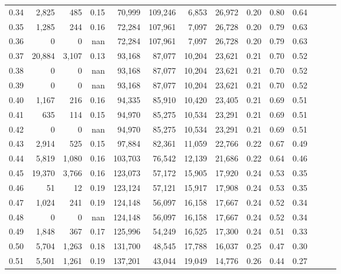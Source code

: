 \begin{tabular}{rrrrrrrrrrrrrr}
0.34 &   2,825 &    485 &  0.15 &   70,999 &  109,246 &   6,853 &  26,972 &  0.20 &  0.80 &      0.64 \\
0.35 &   1,285 &    244 &  0.16 &   72,284 &  107,961 &   7,097 &  26,728 &  0.20 &  0.79 &      0.63 \\
0.36 &       0 &      0 &   nan &   72,284 &  107,961 &   7,097 &  26,728 &  0.20 &  0.79 &      0.63 \\
0.37 &  20,884 &  3,107 &  0.13 &   93,168 &   87,077 &  10,204 &  23,621 &  0.21 &  0.70 &      0.52 \\
0.38 &       0 &      0 &   nan &   93,168 &   87,077 &  10,204 &  23,621 &  0.21 &  0.70 &      0.52 \\
0.39 &       0 &      0 &   nan &   93,168 &   87,077 &  10,204 &  23,621 &  0.21 &  0.70 &      0.52 \\
0.40 &   1,167 &    216 &  0.16 &   94,335 &   85,910 &  10,420 &  23,405 &  0.21 &  0.69 &      0.51 \\
0.41 &     635 &    114 &  0.15 &   94,970 &   85,275 &  10,534 &  23,291 &  0.21 &  0.69 &      0.51 \\
0.42 &       0 &      0 &   nan &   94,970 &   85,275 &  10,534 &  23,291 &  0.21 &  0.69 &      0.51 \\
0.43 &   2,914 &    525 &  0.15 &   97,884 &   82,361 &  11,059 &  22,766 &  0.22 &  0.67 &      0.49 \\
0.44 &   5,819 &  1,080 &  0.16 &  103,703 &   76,542 &  12,139 &  21,686 &  0.22 &  0.64 &      0.46 \\
0.45 &  19,370 &  3,766 &  0.16 &  123,073 &   57,172 &  15,905 &  17,920 &  0.24 &  0.53 &      0.35 \\
0.46 &      51 &     12 &  0.19 &  123,124 &   57,121 &  15,917 &  17,908 &  0.24 &  0.53 &      0.35 \\
0.47 &   1,024 &    241 &  0.19 &  124,148 &   56,097 &  16,158 &  17,667 &  0.24 &  0.52 &      0.34 \\
0.48 &       0 &      0 &   nan &  124,148 &   56,097 &  16,158 &  17,667 &  0.24 &  0.52 &      0.34 \\
0.49 &   1,848 &    367 &  0.17 &  125,996 &   54,249 &  16,525 &  17,300 &  0.24 &  0.51 &      0.33 \\
0.50 &   5,704 &  1,263 &  0.18 &  131,700 &   48,545 &  17,788 &  16,037 &  0.25 &  0.47 &      0.30 \\
0.51 &   5,501 &  1,261 &  0.19 &  137,201 &   43,044 &  19,049 &  14,776 &  0.26 &  0.44 &      0.27 \\

\end{tabular}
